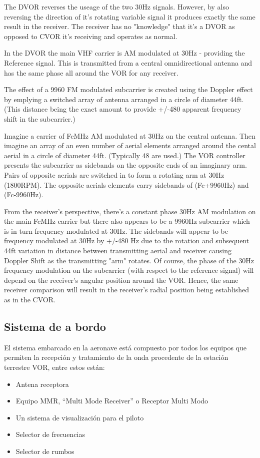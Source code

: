 The DVOR reverses the useage of the two 30Hz signals. However, by also reversing the direction of it's rotating variable signal it produces exactly the same result in the receiver. The receiver has no "knowledge" that it's a DVOR as opposed to CVOR it's receiving and operates as normal.

In the DVOR the main VHF carrier is AM modulated at 30Hz - providing the Reference signal. This is transmitted from a central omnidirectional antenna and has the same phase all around the VOR for any receiver.

The effect of a 9960 FM modulated subcarrier is created using the Doppler effect by emplying a switched array of antenna arranged in a circle of diameter 44ft. (This distance being the exact amount to provide +/-480 apparent frequency shift in the subcarrier.)

Imagine a carrier of FcMHz AM modulated at 30Hz on the central antenna. Then imagine an array of an even number of aerial elements arranged around the cental aerial in a circle of diameter 44ft. (Typically 48 are used.) The VOR controller presents the subcarrier as sidebands on the opposite ends of an imaginary arm. Pairs of opposite aerials are switched in to form a rotating arm at 30Hz (1800RPM). The opposite aerials elements carry sidebands of (Fc+9960Hz) and (Fc-9960Hz).

From the receiver's perspective, there's a constant phase 30Hz AM modulation on the main FcMHz carrier but there also appears to be a 9960Hz subcarrier which is in turn frequency modulated at 30Hz. The sidebands will appear to be frequency modulated at 30Hz by +/-480 Hz due to the rotation and subsequent 44ft variation in distance between transmitting aerial and receiver causing Doppler Shift as the transmitting "arm" rotates. Of course, the phase of the 30Hz frequency modulation on the subcarrier (with respect to the reference signal) will depend on the receiver's angular position around the VOR. Hence, the same receiver comparison will result in the receiver's radial position being established as in the CVOR.


\subsection*{Sistema de a bordo}
\label{Sistema de a bordo}

El sistema embarcado en la aeronave está compuesto por todos los equipos que permiten la recepción y tratamiento de la onda procedente de la estación terrestre VOR, entre estos están:
\begin{itemize}
 \item Antena receptora
\item Equipo MMR, ``Multi Mode Receiver'' o Receptor Multi Modo
\item Un sistema de visualización para el piloto
\item Selector de frecuencias
\item Selector de rumbos
\end{itemize}


